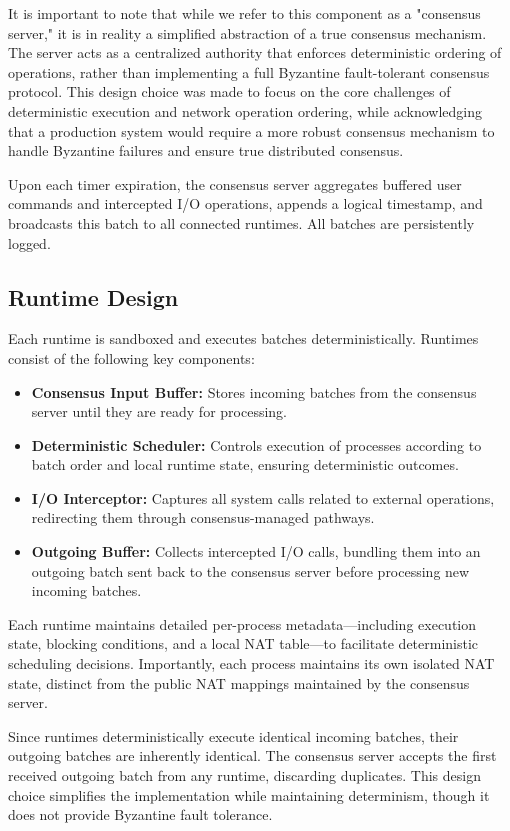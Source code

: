 \documentclass[10pt]{IEEEtran}
\begin{document}
It is important to note that while we refer to this component as a "consensus server," it is in reality a simplified abstraction of a true consensus mechanism. The server acts as a centralized authority that enforces deterministic ordering of operations, rather than implementing a full Byzantine fault-tolerant consensus protocol. This design choice was made to focus on the core challenges of deterministic execution and network operation ordering, while acknowledging that a production system would require a more robust consensus mechanism to handle Byzantine failures and ensure true distributed consensus.

Upon each timer expiration, the consensus server aggregates buffered user commands and intercepted I/O operations, appends a logical timestamp, and broadcasts this batch to all connected runtimes. All batches are persistently logged.

\subsection{Runtime Design}

Each runtime is sandboxed and executes batches deterministically. Runtimes consist of the following key components:

\begin{itemize}
\item \textbf{Consensus Input Buffer:} Stores incoming batches from the consensus server until they are ready for processing.
\item \textbf{Deterministic Scheduler:} Controls execution of processes according to batch order and local runtime state, ensuring deterministic outcomes.
\item \textbf{I/O Interceptor:} Captures all system calls related to external operations, redirecting them through consensus-managed pathways.
\item \textbf{Outgoing Buffer:} Collects intercepted I/O calls, bundling them into an outgoing batch sent back to the consensus server before processing new incoming batches.
\end{itemize}

Each runtime maintains detailed per-process metadata—including execution state, blocking conditions, and a local NAT table—to facilitate deterministic scheduling decisions. Importantly, each process maintains its own isolated NAT state, distinct from the public NAT mappings maintained by the consensus server. 

Since runtimes deterministically execute identical incoming batches, their outgoing batches are inherently identical. The consensus server accepts the first received outgoing batch from any runtime, discarding duplicates. This design choice simplifies the implementation while maintaining determinism, though it does not provide Byzantine fault tolerance.
\end{document}
